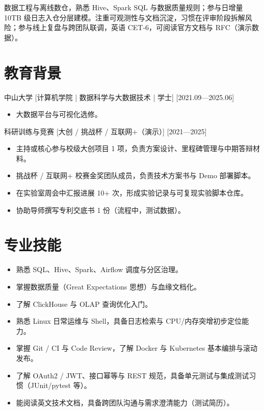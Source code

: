 \documentclass{resume-photo}
\begin{document}

\ResumeTitle

\noindent 数据工程与离线数仓，熟悉 Hive、Spark SQL 与数据质量规则；参与日增量 10TB 级日志入仓分层建模。注重可观测性与文档沉淀，习惯在评审阶段拆解风险；参与线上复盘与跨团队联调，英语 CET-6，可阅读官方文档与 RFC（演示数据）。

\section{教育背景}
\ResumeItem
{中山大学}
[\textnormal{计算机学院 | 数据科学与大数据技术 | 学士}]
[2021.09—2025.06]

\begin{itemize}
  \item 大数据平台与可视化选修。
\end{itemize}


\ResumeItem
{科研训练与竞赛}
[\textnormal{大创 / 挑战杯 / 互联网+（演示）}]
[2021—2025]

\begin{itemize}
  \item 主持或核心参与校级大创项目 1 项，负责方案设计、里程碑管理与中期答辩材料。
  \item 挑战杯 / 互联网+ 校赛金奖团队成员，负责技术方案书与 Demo 部署脚本。
  \item 在实验室周会中汇报进展 10+ 次，形成实验记录与可复现实验脚本仓库。
  \item 协助导师撰写专利交底书 1 份（流程中，测试数据）。
\end{itemize}



\section{专业技能}
\begin{itemize}
  \item 熟悉 SQL、Hive、Spark、Airflow 调度与分区治理。
  \item 掌握数据质量（Great Expectations 思想）与血缘文档化。
  \item 了解 ClickHouse 与 OLAP 查询优化入门。
  \item 熟悉 Linux 日常运维与 Shell，具备日志检索与 CPU/内存突增初步定位能力。
  \item 掌握 Git / CI 与 Code Review，了解 Docker 与 Kubernetes 基本编排与滚动发布。
  \item 了解 OAuth2 / JWT、接口幂等与 REST 规范，具备单元测试与集成测试习惯（JUnit/pytest 等）。
  \item 能阅读英文技术文档，具备跨团队沟通与需求澄清能力（测试简历）。
\end{itemize}
\end{document}
